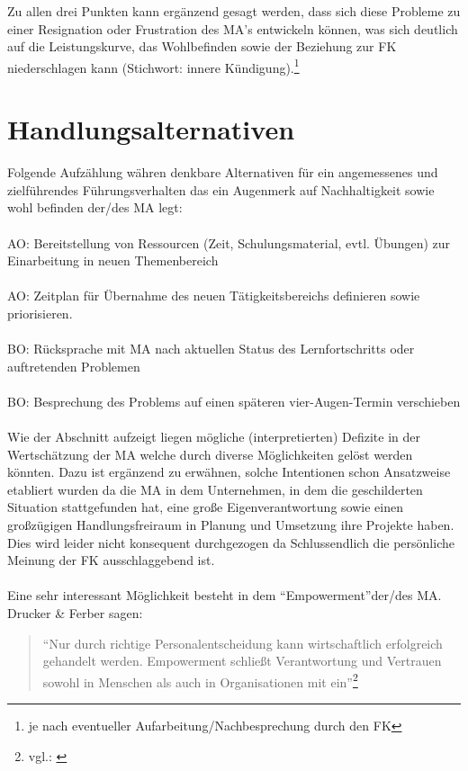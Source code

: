 Zu allen drei Punkten kann ergänzend gesagt werden, dass sich diese Probleme zu einer Resignation oder Frustration des \ac{MA}'s entwickeln können, was sich deutlich auf die Leistungskurve, das Wohlbefinden sowie der Beziehung zur \ac{FK} niederschlagen kann (Stichwort: innere Kündigung).\footnote{je nach eventueller Aufarbeitung/Nachbesprechung durch den \ac{FK} }

\section{Handlungsalternativen}
\label{sec:handlungsalternativen}

Folgende Aufzählung währen denkbare Alternativen für ein angemessenes und zielführendes Führungsverhalten das ein Augenmerk auf Nachhaltigkeit sowie wohl befinden der/des \ac{MA} legt:\\
\\
\ac{AO}: Bereitstellung von Ressourcen (Zeit, Schulungsmaterial, evtl. Übungen) zur Einarbeitung in neuen Themenbereich \\
\\
\ac{AO}: Zeitplan für Übernahme des neuen Tätigkeitsbereichs definieren sowie priorisieren.\\
\\
\ac{BO}: Rücksprache mit \ac{MA} nach aktuellen Status des Lernfortschritts oder 
auftretenden Problemen \\
\\
\ac{BO}: Besprechung des Problems auf einen späteren vier-Augen-Termin verschieben\\
\\

Wie der Abschnitt  aufzeigt liegen mögliche (interpretierten) Defizite in der Wertschätzung der \ac{MA} welche durch diverse Möglichkeiten gelöst werden könnten. 
Dazu ist ergänzend zu erwähnen, solche Intentionen schon Ansatzweise etabliert wurden da die \ac{MA} in dem Unternehmen, in dem die  geschilderten Situation stattgefunden hat, eine große Eigenverantwortung sowie einen großzügigen Handlungsfreiraum in Planung und Umsetzung ihre Projekte haben.
Dies wird leider nicht konsequent durchgezogen da Schlussendlich die persönliche Meinung der \ac{FK} ausschlaggebend ist.\\
\\
Eine sehr interessant Möglichkeit besteht in dem "`Empowerment"'der/des \ac{MA}.
Drucker \& Ferber sagen: 

\begin{quote}
"`Nur durch richtige Personalentscheidung kann wirtschaftlich erfolgreich gehandelt werden. Empowerment schließt Verantwortung und Vertrauen sowohl in Menschen als auch in Organisationen mit ein"'\footnote{vgl.: \cite{Drucker2009}}
\end{quote}


